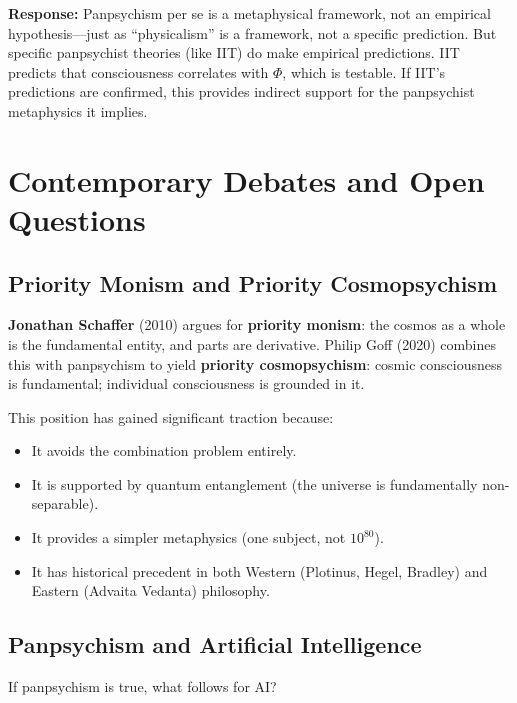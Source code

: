 \documentclass[11pt,a4paper]{report}
\begin{document}
\textbf{Response:} Panpsychism per se is a metaphysical framework, not an empirical hypothesis---just as ``physicalism'' is a framework, not a specific prediction. But specific panpsychist theories (like IIT) do make empirical predictions. IIT predicts that consciousness correlates with $\Phi$, which is testable. If IIT's predictions are confirmed, this provides indirect support for the panpsychist metaphysics it implies.


\chapter{Contemporary Debates and Open Questions}

\section{Priority Monism and Priority Cosmopsychism}

\textbf{Jonathan Schaffer} (2010) argues for \textbf{priority monism}: the cosmos as a whole is the fundamental entity, and parts are derivative. Philip Goff (2020) combines this with panpsychism to yield \textbf{priority cosmopsychism}: cosmic consciousness is fundamental; individual consciousness is grounded in it.

This position has gained significant traction because:
\begin{itemize}[leftmargin=1.5em]
  \item It avoids the combination problem entirely.
  \item It is supported by quantum entanglement (the universe is fundamentally non-separable).
  \item It provides a simpler metaphysics (one subject, not $10^{80}$).
  \item It has historical precedent in both Western (Plotinus, Hegel, Bradley) and Eastern (Advaita Vedanta) philosophy.
\end{itemize}

\section{Panpsychism and Artificial Intelligence}

If panpsychism is true, what follows for AI?
\end{document}
